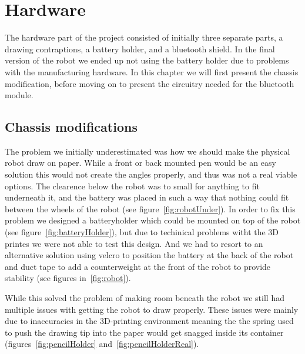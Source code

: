 \section{Hardware}\label{ch:hardware}
The hardware part of the project consisted of initially three separate parts, a drawing contraptions, a battery holder, and a bluetooth shield. 
In the final version of the robot we ended up not using the battery holder due to problems with the manufacturing hardware. 
In this chapter we will first present the chassis modification, before moving on to present the circuitry needed for the bluetooth module. 

\subsection*{Chassis modifications}
The problem we initially underestimated was how we should make the physical robot draw on paper. While a front or back mounted pen would be an easy solution this would not create the angles properly, and thus was not a real viable options. The clearence below the robot was to small for anything to fit underneath it, and the battery was placed in such a way that nothing could fit between the wheels of the robot (see figure~\ref{fig:robotUnder}). In order to fix this problem we designed a batteryholder which could be mounted on top of the robot (see figure~\ref{fig:batteryHolder}), but due to techinical problems witht the 3D printes we were not able to test this design. And we had to resort to an alternative solution using velcro to position the battery at the back of the robot and duct tape to add a counterweight at the front of the robot to provide stability (see figures in~\ref{fig:robot}). 

\bigskip\noindent
While this solved the problem of making room beneath the robot we still had multiple issues with getting the robot to draw properly. These issues were mainly due to inaccuracies in the 3D-printing environment meaning the the spring used to push the drawing tip into the paper would get snagged inside its container (figures~\ref{fig:pencilHolder} and~\ref{fig:pencilHolderReal}).


